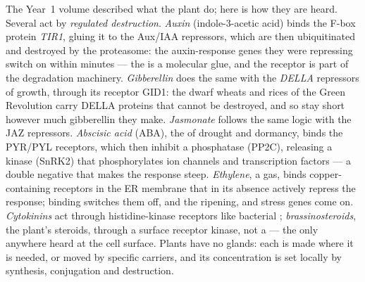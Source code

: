 \begin{definition}\label{def:b3:plant-molecular-physiology:hormones}
The Year~1 volume described what the plant  do; here is how
they are heard. Several act by \emph{regulated destruction}.
\emph{Auxin} (indole-3-acetic acid) binds the F-box protein
\emph{TIR1}, gluing it to the Aux/IAA repressors, which are then
ubiquitinated and destroyed by the proteasome: the auxin-response genes
they were repressing switch on within minutes --- the  is a
molecular glue, and the receptor is part of the degradation machinery.
\emph{Gibberellin} does the same with the \emph{DELLA} repressors of
growth, through its receptor GID1: the dwarf wheats and rices of the
Green Revolution carry DELLA proteins that cannot be destroyed, and so
stay short however much gibberellin they make. \emph{Jasmonate}
follows the same logic with the JAZ repressors. \emph{Abscisic acid}
(ABA), the  of drought and dormancy, binds the PYR/PYL
receptors, which then inhibit a phosphatase (PP2C), releasing a kinase
(SnRK2) that phosphorylates ion channels and transcription factors ---
a double negative that makes the response steep. \emph{Ethylene}, a
gas, binds copper-containing receptors in the ER membrane that in its
absence actively repress the response; binding switches them off, and
the ripening,  and stress genes come on. \emph{Cytokinins}
act through histidine-kinase receptors like bacterial ; \emph{brassinosteroids}, the plant's steroids, through a
surface receptor kinase, not a  --- the only  anywhere heard at the cell surface. Plants have no glands: each
 is made where it is needed, or moved by specific carriers, and
its concentration is set locally by synthesis, conjugation and
destruction.
\end{definition}

